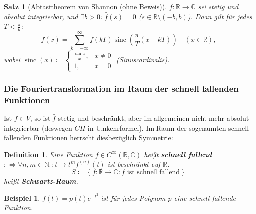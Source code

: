 \documentclass[12pt]{extreport} %
\newcommand{\C}{\mathbb{C}}
\newcommand{\N}{\mathbb{N}}
\newcommand{\R}{\mathbb{R}}
\theoremstyle{named}
\theoremstyle{nnamed}
\theoremstyle{itshape}
\newtheorem{satz}[unnamedtheorem]{Satz}
\newtheorem*{definition}{Definition}
\theoremstyle{normal}
\newtheorem*{beispiel*}{Beispiel}
\begin{document}
 
\begin{satz}[Abtasttheorem von Shannon (ohne Beweis)] \label{24.9:satz}
	$f \colon \R \rightarrow \C$ sei stetig und absolut integrierbar, und $\exists b > 0$: $\hat{f}(s) = 0$ ($s \in \R \setminus (-b, b)$). Dann gilt für jedes $T < \frac{\pi}{b}$:
	$$ f(x) = \sum_{k=-\infty}^{\infty} f(kT) \operatorname{sinc}\left( \frac{\pi}{T} (x - kT) \right) \quad (x \in \R), $$
	wobei $\operatorname{sinc}(x) \coloneqq \begin{cases} \frac{\sin x}{x}, & x \neq 0 \\ 1, & x = 0 \end{cases}$ (Sinuscardinalis).	
\end{satz}

\subsubsection*{Die Fouriertransformation im Raum der schnell fallenden Funktionen}

Ist $f \in V$, so ist $\hat{f}$ stetig und beschränkt, aber im allgemeinen nicht mehr absolut integrierbar (deswegen $CH$ in Umkehrformel). Im Raum der sogenannten schnell fallenden Funktionen herrscht diesbezüglich Symmetrie:

 
\begin{definition}
	Eine Funktion $f \in C^{\infty}(\R, \C)$ hei{\ss}t \textbf{schnell fallend} $:\iff \forall n, m \in \N_{0}: t \mapsto t^{m} f^{(n)}(t)$ ist beschränkt auf $\R$.
	$$ S \coloneqq \left\{ f \colon \R \rightarrow \C : f \text{ ist schnell fallend} \right\} $$
	hei{\ss}t \textbf{Schwartz-Raum}.
\end{definition}

\begin{beispiel*}
	$f(t) = p(t) e^{-t^{2}}$ ist für jedes Polynom $p$ eine schnell fallende Funktion.
\end{beispiel*}
\end{document}
